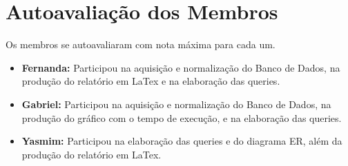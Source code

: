 \documentclass{article}
\begin{document}
\section{Autoavaliação dos Membros}
Os membros se autoavaliaram com nota máxima para cada um.
\begin{itemize}
\item \textbf{Fernanda:} Participou na aquisição e normalização do Banco de Dados, na produção do relatório em LaTex e na elaboração das queries.
\item \textbf{Gabriel:} Participou na aquisição e normalização do Banco de Dados, na produção do gráfico com o tempo de execução, e na elaboração das queries.
\item \textbf{Yasmim:} Participou na elaboração das queries e do diagrama ER, além da produção do relatório em LaTex.
\end{itemize}




\end{document}
